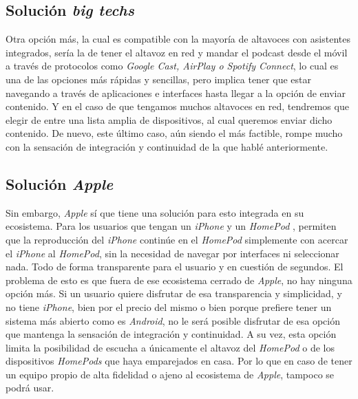 \subsection{Solución \emph{big techs}}
Otra opción más, la cual es compatible con la mayoría de altavoces con
asistentes integrados, sería la de tener el altavoz en red y mandar el podcast
desde el móvil a través de protocolos como \emph{Google Cast, AirPlay o Spotify
Connect}, lo cual es una de las opciones más rápidas y sencillas, pero implica
tener que estar navegando a través de aplicaciones e interfaces hasta llegar a
la opción de enviar contenido. Y en el caso de que tengamos muchos altavoces en
red, tendremos que elegir de entre una lista amplia de dispositivos, al cual
queremos enviar dicho contenido. De nuevo, este último caso, aún siendo el más
factible, rompe mucho con la sensación de integración y continuidad de la que
hablé anteriormente. 

\subsection{Solución \emph{Apple}}
Sin embargo, \emph{Apple} sí que tiene una solución para esto integrada en su
ecosistema. Para los usuarios que tengan un \emph{iPhone} y un \emph{HomePod} \cite{HomePod},
permiten que la reproducción del \emph{iPhone} continúe en el \emph{HomePod}
simplemente con acercar el \emph{iPhone} al \emph{HomePod}, sin la necesidad de
navegar por interfaces ni seleccionar nada. Todo de forma transparente para el
usuario y en cuestión de segundos. El problema de esto es que fuera de ese
ecosistema cerrado de \emph{Apple}, no hay ninguna opción más. Si un usuario
quiere disfrutar de esa transparencia y simplicidad, y no tiene \emph{iPhone},
bien por el precio del mismo o bien porque prefiere tener un sistema más abierto
como es \emph{Android}, no le será posible disfrutar de esa opción que mantenga
la sensación de integración y continuidad. A su vez, esta opción limita la
posibilidad de escucha a únicamente el altavoz del \emph{HomePod} o de los
dispositivos \emph{HomePods} que haya emparejados en casa. Por lo que en caso de
tener un equipo propio de alta fidelidad o ajeno al ecosistema de \emph{Apple},
tampoco se podrá usar.\\

